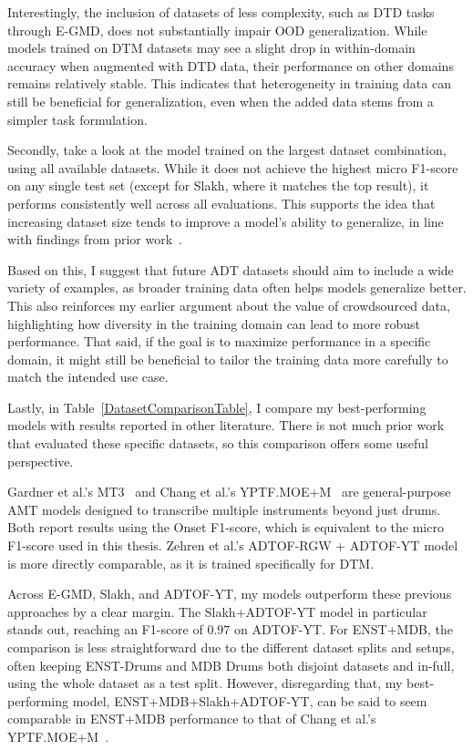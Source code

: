 Interestingly, the inclusion of datasets of less complexity, such as \gls{DTD} tasks through E-GMD, does not substantially impair \gls{OOD} generalization. While models trained on \gls{DTM} datasets may see a slight drop in within-domain accuracy when augmented with \gls{DTD} data, their performance on other domains remains relatively stable. This indicates that heterogeneity in training data can still be beneficial for generalization, even when the added data stems from a simpler task formulation.

Secondly, take a look at the model trained on the largest dataset combination, using all available datasets. While it does not achieve the highest micro F1-score on any single test set (except for Slakh, where it matches the top result), it performs consistently well across all evaluations. This supports the idea that increasing dataset size tends to improve a model's ability to generalize, in line with findings from prior work~\cite{signals4040042}. 

Based on this, I suggest that future \gls{ADT} datasets should aim to include a wide variety of examples, as broader training data often helps models generalize better. This also reinforces my earlier argument about the value of crowdsourced data, highlighting how diversity in the training domain can lead to more robust performance. That said, if the goal is to maximize performance in a specific domain, it might still be beneficial to tailor the training data more carefully to match the intended use case.

Lastly, in Table~\ref{DatasetComparisonTable}, I compare my best-performing models with results reported in other literature. There is not much prior work that evaluated these specific datasets, so this comparison offers some useful perspective.

Gardner et al.'s MT3~\cite{gardner2022mt3multitaskmultitrackmusic} and Chang et al.'s YPTF.MOE+M~\cite{chang2024yourmt3+} are general-purpose \gls{AMT} models designed to transcribe multiple instruments beyond just drums. Both report results using the Onset F1-score, which  is equivalent to the micro F1-score used in this thesis. Zehren et al.'s ADTOF-RGW + ADTOF-YT model~\cite{signals4040042} is more directly comparable, as it is trained specifically for \gls{DTM}.

Across E-GMD, Slakh, and ADTOF-YT, my models outperform these previous approaches by a clear margin. The Slakh+ADTOF-YT model in particular stands out, reaching an F1-score of $0.97$ on ADTOF-YT. For ENST+MDB, the comparison is less straightforward due to the different dataset splits and setups, often keeping ENST-Drums and MDB Drums both disjoint datasets and in-full, using the whole dataset as a test split. However, disregarding that, my best-performing model, ENST+MDB+Slakh+ADTOF-YT, can be said to seem comparable in ENST+MDB performance to that of Chang et al.'s YPTF.MOE+M~\cite{chang2024yourmt3+}. 

